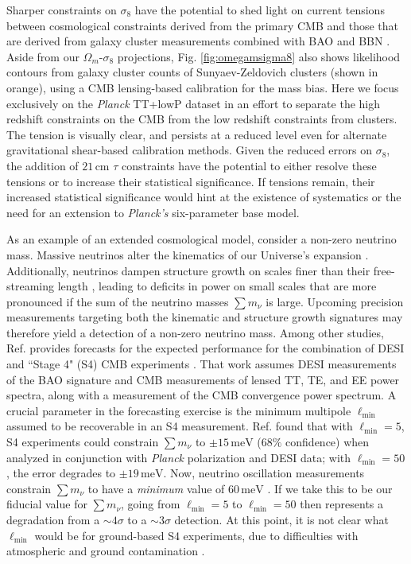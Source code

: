 \documentclass[twocolumn,aps,prd,nofootinbib,showpacs,superscriptaddress]{revtex4-1}
\begin{document}
Sharper constraints on $\sigma_8$ have the potential to shed light on current tensions between cosmological constraints derived from the primary CMB and those that are derived from galaxy cluster measurements combined with BAO and BBN \cite{Planck2015clusters}. Aside from our $\Omega_m$-$\sigma_8$ projections, Fig. \ref{fig:omegamsigma8} also shows likelihood contours from galaxy cluster counts of Sunyaev-Zeldovich clusters (shown in orange), using a CMB lensing-based calibration for the mass bias. Here we focus exclusively on the \emph{Planck} TT+lowP dataset in an effort to separate the high redshift constraints on the CMB from the low redshift constraints from clusters. The tension is visually clear, and persists at a reduced level even for alternate gravitational shear-based calibration methods. Given the reduced errors on $\sigma_8$, the addition of $21\,\textrm{cm}$ $\tau$ constraints have the potential to either resolve these tensions or to increase their statistical significance. If tensions remain, their increased statistical significance would hint at the existence of systematics or the need for an extension to \emph{Planck's} six-parameter base model.

As an example of an extended cosmological model, consider a non-zero neutrino mass. Massive neutrinos alter the kinematics of our Universe's expansion \cite{pan_and_knox2015}. Additionally, neutrinos dampen structure growth on scales finer than their free-streaming length \cite{hu_and_eisenstein1998,eisenstein_and_hu1999,hu_et_al1998}, leading to deficits in power on small scales that are more pronounced if the sum of the neutrino masses $\sum m_\nu$ is large. Upcoming precision measurements targeting both the kinematic and structure growth signatures may therefore yield a detection of a non-zero neutrino mass. Among other studies, Ref. \cite{allison_et_al2015} provides forecasts for the expected performance for the combination of DESI and ``Stage 4" (S4) CMB experiments \cite{wu_et_al2014,Abazajian_et_al2015}. That work assumes DESI measurements of the BAO signature and CMB measurements of lensed TT, TE, and EE power spectra, along with a measurement of the CMB convergence power spectrum. A crucial parameter in the forecasting exercise is the minimum multipole $\ell_\textrm{min}$ assumed to be recoverable in an S4 measurement. Ref. \cite{allison_et_al2015} found that with $\ell_\textrm{min} =  5$, S4 experiments could constrain $\sum m_\nu$ to $\pm 15 \,\textrm{meV}$ ($68\%$ confidence) when analyzed in conjunction with \emph{Planck} polarization and DESI data; with $\ell_\textrm{min} =  50$, the error degrades to $\pm 19 \,\textrm{meV}$. Now, neutrino oscillation measurements constrain $\sum m_\nu$ to have a \emph{minimum} value of $60\,\textrm{meV}$ \cite{smirnov2006,fogli_et_al2012,feldman_et_al2013,Abazajian_et_al2015}. If we take this to be our fiducial value for $\sum m_\nu$, going from $\ell_\textrm{min} =  5$ to $\ell_\textrm{min} =  50$ then represents a degradation from a $\sim\!4 \sigma$ to a $\sim\!3 \sigma$ detection. At this point, it is not clear what $\ell_\textrm{min}$ would be for ground-based S4 experiments, due to difficulties with atmospheric and ground contamination \cite{allison_et_al2015}.
\end{document}
